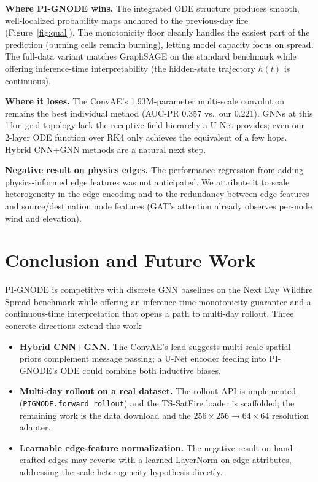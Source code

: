 \documentclass{article}
\begin{document}
\textbf{Where PI-GNODE wins.} The integrated ODE structure produces smooth,
well-localized probability maps anchored to the previous-day fire
(Figure~\ref{fig:qual}). The monotonicity floor cleanly handles the easiest
part of the prediction (burning cells remain burning), letting model capacity
focus on spread. The full-data variant matches GraphSAGE on the standard
benchmark while offering inference-time interpretability (the hidden-state
trajectory $h(t)$ is continuous).

\textbf{Where it loses.} The ConvAE's 1.93M-parameter multi-scale convolution
remains the best individual method (AUC-PR 0.357 vs.\ our 0.221). GNNs at
this 1\,km grid topology lack the receptive-field hierarchy a U-Net
provides; even our 2-layer ODE function over RK4 only achieves the
equivalent of a few hops. Hybrid CNN+GNN methods are a natural next step.

\textbf{Negative result on physics edges.} The performance regression from
adding physics-informed edge features was not anticipated. We attribute it to
scale heterogeneity in the edge encoding and to the redundancy between edge
features and source/destination node features (GAT's attention already
observes per-node wind and elevation).

\section{Conclusion and Future Work}\label{sec:conclusion}

PI-GNODE is competitive with discrete GNN baselines on the Next Day Wildfire
Spread benchmark while offering an inference-time monotonicity guarantee and
a continuous-time interpretation that opens a path to multi-day rollout.
Three concrete directions extend this work:

\begin{itemize}\itemsep0pt
\item \textbf{Hybrid CNN+GNN.} The ConvAE's lead suggests multi-scale spatial
priors complement message passing; a U-Net encoder feeding into PI-GNODE's
ODE could combine both inductive biases.
\item \textbf{Multi-day rollout on a real dataset.} The rollout API is
implemented (\texttt{PIGNODE.forward\_rollout}) and the TS-SatFire loader is
scaffolded; the remaining work is the data download and the
$256{\times}256 \to 64{\times}64$ resolution adapter.
\item \textbf{Learnable edge-feature normalization.} The negative result on
hand-crafted edges may reverse with a learned LayerNorm on edge attributes,
addressing the scale heterogeneity hypothesis directly.
\end{itemize}
\end{document}
